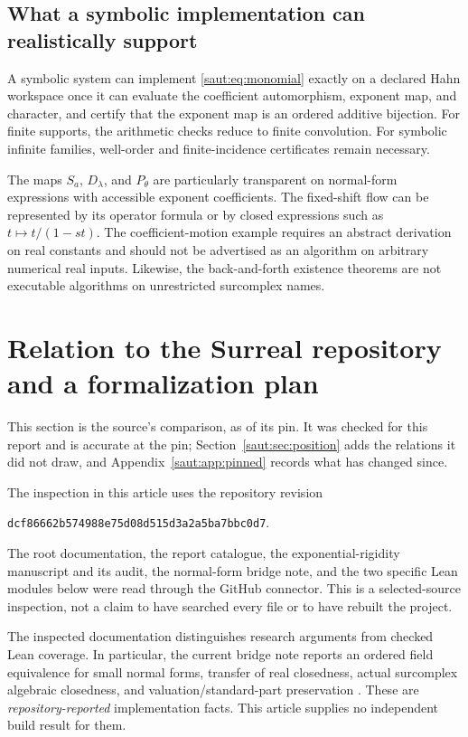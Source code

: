 \documentclass[11pt]{article}
\theoremstyle{definition}
\theoremstyle{remark}
\newcommand{\repoSHA}{\texttt{dcf86662\allowbreak b574988e\allowbreak 75d08d51\allowbreak 5d3a2a5b\allowbreak a7bbc0d7}}
\numberwithin{equation}{section}
\begin{document}
\subsection{What a symbolic implementation can realistically support}

A symbolic system can implement \eqref{saut:eq:monomial} exactly on a declared
Hahn workspace once it can evaluate the coefficient automorphism, exponent
map, and character, and certify that the exponent map is an ordered
additive bijection. For finite supports, the arithmetic checks reduce to
finite convolution. For symbolic infinite families, well-order and
finite-incidence certificates remain necessary.

The maps $S_a$, $D_\lambda$, and $P_\theta$ are particularly transparent on
normal-form expressions with accessible exponent coefficients. The
fixed-shift flow can be represented by its operator formula or by closed
expressions such as $t\mapsto t/(1-st)$. The coefficient-motion example
requires an abstract derivation on real constants and should not be
advertised as an algorithm on arbitrary numerical real inputs.
Likewise, the back-and-forth existence theorems are not executable
algorithms on unrestricted surcomplex names.

\section{Relation to the Surreal repository and a formalization plan}\label{saut:sec:repo}

This section is the source's comparison, as of its pin. It was checked for
this report and is accurate at the pin; Section~\ref{saut:sec:position}
adds the relations it did not draw, and
Appendix~\ref{saut:app:pinned} records what has changed since.

The inspection in this article uses the repository revision
\begin{center}
\repoSHA.
\end{center}
The root documentation, the report catalogue, the exponential-rigidity
manuscript and its audit, the normal-form bridge note, and the two specific
Lean modules below were read through the GitHub connector. This is a
selected-source inspection, not a claim to have searched every file or to
have rebuilt the project.

The inspected documentation distinguishes research arguments from checked
Lean coverage. In particular, the current bridge note reports an ordered
field equivalence for small normal forms, transfer of real closedness,
actual surcomplex algebraic closedness, and valuation/standard-part
preservation \cite{RepoBridge}. These are \emph{repository-reported}
implementation facts. This article supplies no independent build result
for them.
\end{document}
